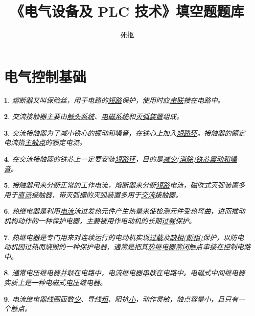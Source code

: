 \documentclass{ctexart}
\title{《电气设备及 PLC 技术》填空题题库}
\author{死抠}
\theoremstyle{change}
\newtheorem{ti}{}[section]
\begin{document}
\maketitle
\tableofcontents
\section{电气控制基础}

\begin{ti}
	熔断器又叫保险丝，用于电路的\uline{短路}保护，使用时应\uline{串联}接在电路中。
\end{ti}

\begin{ti}
	交流接触器主要由\uline{触头系统}、\uline{电磁系统}和\uline{灭弧装置}组成。
\end{ti}

\begin{ti}
	交流接触器为了减小铁心的振动和噪音，在铁心上加入\uline{短路环}。接触器的额定电流指\uline{主触点}的额定电流。
\end{ti}

\begin{ti}
	在交流接触器的铁芯上一定要安装\uline{短路环}，目的是\uline{减少(消除)铁芯震动和噪音}。
\end{ti}

\begin{ti}
	接触器用来分断正常的工作电流，熔断器来分断\uline{短路}电流，磁吹式灭弧装置多用于\uline{直流}接触器，带灭弧栅的灭弧装置多用于\uline{交流}接触器。
\end{ti}

\begin{ti}
	热继电器是利用\uline{电流}流过发热元件产生热量来使检测元件受热弯曲，进而推动机构动作的一种保护电器，主要被用作电动机的长期\uline{过载}保护。
\end{ti}

\begin{ti}
	热继电器是专门用来对连续运行的电动机实现\uline{过载}及\uline{缺相(断相)}保护，以防电动机因过热而烧毁的一种保护电器，通常是把其\uline{热继电器常闭}触点串接在控制电路中。
\end{ti}

\begin{ti}
	通常电压继电器\uline{并}联在电路中，电流继电器\uline{串}联在电路中。电磁式中间继电器实质上是一种电磁式\uline{电压}继电器。
\end{ti}

\begin{ti}
	电流继电器线圈匝数\uline{少}、导线\uline{粗}、阻抗\uline{小}，动作灵敏，触点容量小，且只有一个触点。
\end{ti}
\end{document}
